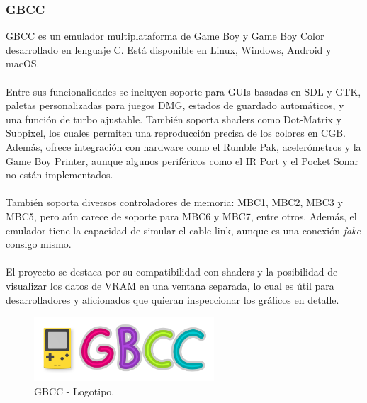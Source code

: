 \subsubsection{GBCC}
GBCC es un emulador multiplataforma de Game Boy y Game Boy Color desarrollado en lenguaje C. Está disponible en Linux, Windows, Android y macOS.
\\\\
Entre sus funcionalidades se incluyen soporte para GUIs basadas en SDL y GTK, paletas personalizadas para juegos DMG, estados de guardado automáticos, y una función de turbo ajustable. También soporta shaders como Dot-Matrix y Subpixel, los cuales permiten una reproducción precisa de los colores en CGB. Además, ofrece integración con hardware como el Rumble Pak, acelerómetros y la Game Boy Printer, aunque algunos periféricos como el IR Port y el Pocket Sonar no están implementados.
\\\\
También soporta diversos controladores de memoria: MBC1, MBC2, MBC3 y MBC5, pero aún carece de soporte para MBC6 y MBC7, entre otros. Además, el emulador tiene la capacidad de simular el cable link, aunque es una conexión \textit{fake} consigo mismo.
\\\\
El proyecto se destaca por su compatibilidad con shaders y la posibilidad de visualizar los datos de VRAM en una ventana separada, lo cual es útil para desarrolladores y aficionados que quieran inspeccionar los gráficos en detalle.

\begin{figure}[h]
    \centering
    \includegraphics[width=0.6\textwidth]{include/images/gbcclogo.png}
    \caption{GBCC - Logotipo.}
    \label{figure:gbcclogo}
\end{figure}

